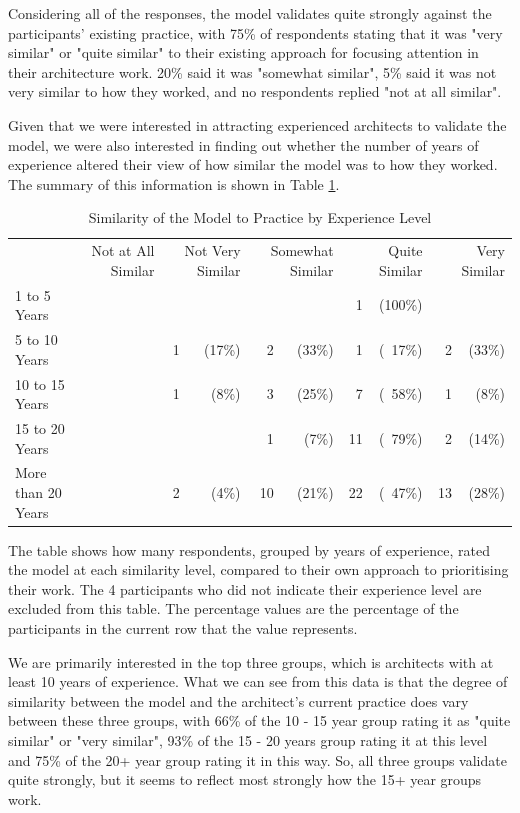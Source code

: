 Considering all of the responses, the model validates quite strongly against the participants' existing practice, with 75\% of respondents stating that it was "very similar" or "quite similar" to their existing approach for focusing attention in their architecture work.  20\% said it was "somewhat similar", 5\% said it was not very similar to how they worked, and no respondents replied "not at all similar".

Given that we were interested in attracting experienced architects to validate the model, we were also interested in finding out whether the number of years of experience altered their view of how similar the model was to how they worked.  The summary of this information is shown in Table \ref{table:similaritybyexp}.


\begin{table}
\caption{Similarity of the Model to Practice by Experience Level}
\label{table:similaritybyexp}
\footnotesize
\begin{tabular}{l rrrrrrrrrr}
                & \multicolumn{2}{P{1.5cm}}{Not at All Similar} & \multicolumn{2}{P{1.5cm}}{Not Very Similar} & \multicolumn{2}{P{1.5cm}}{Somewhat Similar} & \multicolumn{2}{P{1.5cm}}{Quite Similar} & \multicolumn{2}{P{1.5cm}}{Very Similar} \\
1 to 5 Years       && &   &        &    &       & 1  & (100\%) &	&        \\
5 to 10 Years      && & 1 & (17\%) & 2  &(33\%) & 1  & (~17\%) & 2  & (33\%) \\
10 to 15 Years     && & 1 & (8\%)  & 3  &(25\%) & 7  & (~58\%) & 1  & (8\%)  \\
15 to 20 Years     && &   &        & 1  &(7\%)  & 11 & (~79\%) & 2  & (14\%) \\
More than 20 Years && & 2 & (4\%)  & 10 &(21\%) & 22 & (~47\%) & 13 & (28\%) \\
\end{tabular}
\end{table}

The table shows how many respondents, grouped by years of experience, rated the model at each similarity level, compared to their own approach to prioritising their work.  The 4 participants who did not indicate their experience level are excluded from this table.  The percentage values are the percentage of the participants in the current row that the value represents.

We are primarily interested in the top three groups, which is architects with at least 10 years of experience.  What we can see from this data is that the degree of similarity between the model and the architect's current practice does vary between these three groups, with 66\% of the 10 - 15 year group rating it as "quite similar" or "very similar", 93\% of the 15 - 20 years group rating it at this level and 75\% of the 20+ year group rating it in this way.  So, all three groups validate quite strongly, but it seems to reflect most strongly how the 15+ year groups work.

